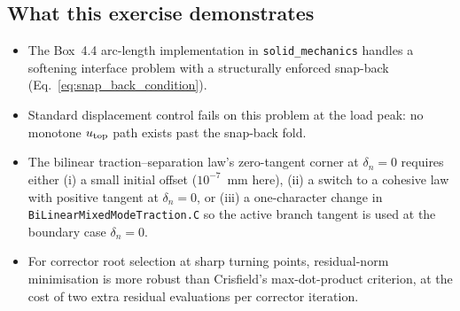 \subsection{What this exercise demonstrates}

\begin{itemize}
\item The Box~4.4 arc-length implementation in \texttt{solid\_mechanics}
      handles a softening interface problem with a structurally enforced
      snap-back (Eq.~\eqref{eq:snap_back_condition}).
\item Standard displacement control fails on this problem at the load peak:
      no monotone $u_{\rm top}$ path exists past the snap-back fold.
\item The bilinear traction--separation law's zero-tangent corner at
      $\delta_n = 0$ requires either (i) a small initial offset
      ($10^{-7}$~mm here), (ii) a switch to a cohesive law with positive
      tangent at $\delta_n = 0$, or (iii) a one-character change in
      \texttt{BiLinearMixedModeTraction.C} so the active branch tangent is
      used at the boundary case $\delta_n = 0$.
\item For corrector root selection at sharp turning points, residual-norm
      minimisation is more robust than Crisfield's max-dot-product
      criterion, at the cost of two extra residual evaluations per
      corrector iteration.
\end{itemize}
